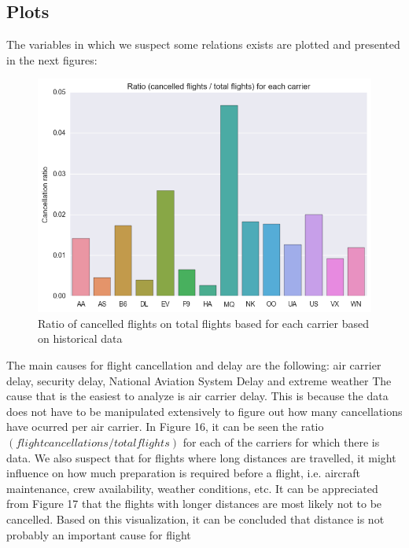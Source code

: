 \documentclass{article}
\begin{document}
    \subsection{Plots}
    The variables in which we suspect some relations exists are plotted and presented in the next figures:\newline
    
    \begin{figure}[H]
      \includegraphics[width=\linewidth]{graph/ratio_cancelled_total.png}
      \caption{Ratio of cancelled flights on total flights based for each carrier based on
      historical data}
      \label{fig:graph1}
    \end{figure}
    The main causes for flight cancellation and delay are the following: air carrier delay,
    security delay, National Aviation System Delay and extreme weather\newline
    \indent The cause that is the easiest to analyze is air carrier delay. This is because
    the data does not have to be manipulated extensively to figure out how many cancellations
    have ocurred per air carrier. In Figure 16, it can be seen the ratio $(flight cancellations/total flights)$
    for each of the carriers for which there is data.\newline
    \indent We also suspect that for flights where long distances are travelled, it might influence
    on how much preparation is required before a flight, i.e. aircraft maintenance, crew
    availability, weather conditions, etc. It can be appreciated from Figure 17 that the
    flights with longer distances are most likely not to be cancelled. Based on this visualization,
    it can be concluded that distance is not probably an important cause for flight
\end{document}

